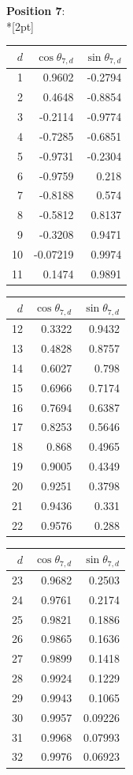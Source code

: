 \noindent \textbf{Position 7}:\\*[2pt]
{\tablefont \begin{tabular}[t]{r|rr}
$d$ & $\cos\theta_{7,d}$ & $\sin\theta_{7,d}$ \\\hline
1 & 0.9602 & -0.2794 \\
2 & 0.4648 & -0.8854 \\
3 & -0.2114 & -0.9774 \\
4 & -0.7285 & -0.6851 \\
5 & -0.9731 & -0.2304 \\
6 & -0.9759 & 0.218 \\
7 & -0.8188 & 0.574 \\
8 & -0.5812 & 0.8137 \\
9 & -0.3208 & 0.9471 \\
10 & -0.07219 & 0.9974 \\
11 & 0.1474 & 0.9891
\end{tabular}\kern4pt
\begin{tabular}[t]{r|rr}
$d$ & $\cos\theta_{7,d}$ & $\sin\theta_{7,d}$ \\\hline
12 & 0.3322 & 0.9432 \\
13 & 0.4828 & 0.8757 \\
14 & 0.6027 & 0.798 \\
15 & 0.6966 & 0.7174 \\
16 & 0.7694 & 0.6387 \\
17 & 0.8253 & 0.5646 \\
18 & 0.868 & 0.4965 \\
19 & 0.9005 & 0.4349 \\
20 & 0.9251 & 0.3798 \\
21 & 0.9436 & 0.331 \\
22 & 0.9576 & 0.288
\end{tabular}\kern4pt
\begin{tabular}[t]{r|rr}
$d$ & $\cos\theta_{7,d}$ & $\sin\theta_{7,d}$ \\\hline
23 & 0.9682 & 0.2503 \\
24 & 0.9761 & 0.2174 \\
25 & 0.9821 & 0.1886 \\
26 & 0.9865 & 0.1636 \\
27 & 0.9899 & 0.1418 \\
28 & 0.9924 & 0.1229 \\
29 & 0.9943 & 0.1065 \\
30 & 0.9957 & 0.09226 \\
31 & 0.9968 & 0.07993 \\
32 & 0.9976 & 0.06923 \\

\end{tabular}}
